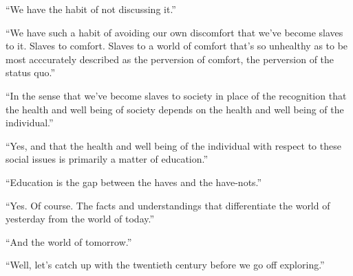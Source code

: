 

``We have the habit of not discussing it.''

``We have such a habit of avoiding our own discomfort that we've
become slaves to it.  Slaves to comfort.  Slaves to a world of comfort
that's so unhealthy as to be most acccurately described as the
perversion of comfort, the perversion of the status quo.''

``In the sense that we've become slaves to society in place of the
recognition that the health and well being of society depends on the
health and well being of the individual.''

``Yes, and that the health and well being of the individual with
respect to these social issues is primarily a matter of education.''

``Education is the gap between the haves and the have-nots.''

``Yes.  Of course.  The facts and understandings that differentiate
the world of yesterday from the world of today.''

``And the world of tomorrow.''

``Well, let's catch up with the twentieth century before we go off
exploring.''




\bye
